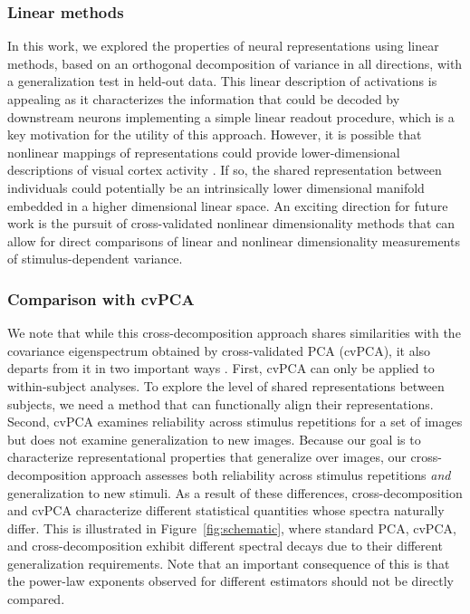 \documentclass[10pt]{article}
\begin{document}
\subsubsection{Linear methods}\label{linear-methods}

In this work, we explored the properties of neural representations using linear methods, based on an orthogonal decomposition of variance in all directions, with a generalization test in held-out data. This linear description of activations is appealing as it characterizes the information that could be decoded by downstream neurons implementing a simple linear readout procedure, which is a key motivation for the utility of this approach. However, it is possible that nonlinear mappings of representations could provide lower-dimensional descriptions of visual cortex activity \autocite{Ansuini2019,De2023,Jazayeri2021}. If so, the shared representation between individuals could potentially be an intrinsically lower dimensional manifold embedded in a higher dimensional linear space. An exciting direction for future work is the pursuit of cross-validated nonlinear dimensionality methods that can allow for direct comparisons of linear and nonlinear dimensionality measurements of stimulus-dependent variance.

\subsubsection{Comparison with cvPCA}\label{sec:comparison-with-cvpca}

We note that while this cross-decomposition approach shares similarities with the covariance eigenspectrum obtained by cross-validated PCA (cvPCA), it also departs from it in two important ways \autocite{Stringer2019}. First, cvPCA can only be applied to within-subject analyses. To explore the level of shared representations between subjects, we need a method that can functionally align their representations. Second, cvPCA examines reliability across stimulus repetitions for a set of images but does not examine generalization to new images. Because our goal is to characterize representational properties that generalize over images, our cross-decomposition approach assesses both reliability across stimulus repetitions \emph{and} generalization to new stimuli. As a result of these differences, cross-decomposition and cvPCA characterize different statistical quantities whose spectra naturally differ. This is illustrated in Figure~\ref{fig:schematic}, where standard PCA, cvPCA, and cross-decomposition exhibit different spectral decays due to their different generalization requirements. Note that an important consequence of this is that the power-law exponents observed for different estimators should not be directly compared.
\end{document}
